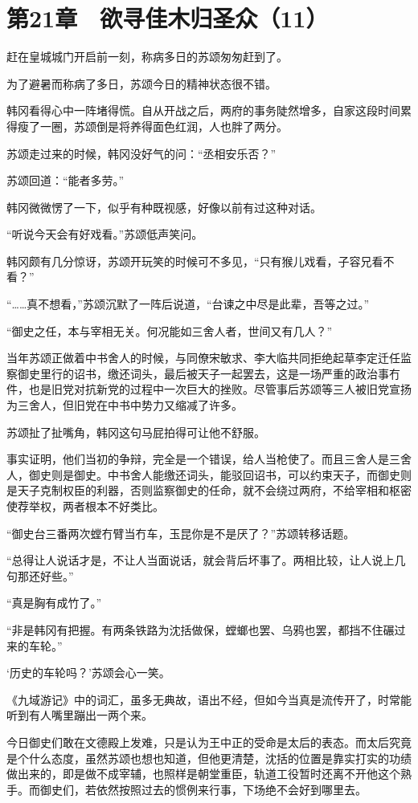 \section{第21章　欲寻佳木归圣众（11）}

赶在皇城城门开启前一刻，称病多日的苏颂匆匆赶到了。

为了避暑而称病了多日，苏颂今日的精神状态很不错。

韩冈看得心中一阵堵得慌。自从开战之后，两府的事务陡然增多，自家这段时间累得瘦了一圈，苏颂倒是将养得面色红润，人也胖了两分。

苏颂走过来的时候，韩冈没好气的问：“丞相安乐否？”

苏颂回道：“能者多劳。”

韩冈微微愣了一下，似乎有种既视感，好像以前有过这种对话。

“听说今天会有好戏看。”苏颂低声笑问。

韩冈颇有几分惊讶，苏颂开玩笑的时候可不多见，“只有猴儿戏看，子容兄看不看？”

“……真不想看，”苏颂沉默了一阵后说道，“台谏之中尽是此辈，吾等之过。”

“御史之任，本与宰相无关。何况能如三舍人者，世间又有几人？”

当年苏颂正做着中书舍人的时候，与同僚宋敏求、李大临共同拒绝起草李定迁任监察御史里行的诏书，缴还词头，最后被天子一起罢去，这是一场严重的政治事冇件，也是旧党对抗新党的过程中一次巨大的挫败。尽管事后苏颂等三人被旧党宣扬为三舍人，但旧党在中书中势力又缩减了许多。

苏颂扯了扯嘴角，韩冈这句马屁拍得可让他不舒服。

事实证明，他们当初的争辩，完全是一个错误，给人当枪使了。而且三舍人是三舍人，御史则是御史。中书舍人能缴还词头，能驳回诏书，可以约束天子，而御史则是天子克制权臣的利器，否则监察御史的任命，就不会绕过两府，不给宰相和枢密使荐举权，两者根本不好类比。

“御史台三番两次螳冇臂当冇车，玉昆你是不是厌了？”苏颂转移话题。

“总得让人说话才是，不让人当面说话，就会背后坏事了。两相比较，让人说上几句那还好些。”

“真是胸有成竹了。”

“非是韩冈有把握。有两条铁路为沈括做保，螳螂也罢、乌鸦也罢，都挡不住碾过来的车轮。”

‘历史的车轮吗？’苏颂会心一笑。

《九域游记》中的词汇，虽多无典故，语出不经，但如今当真是流传开了，时常能听到有人嘴里蹦出一两个来。

今日御史们敢在文德殿上发难，只是认为王中正的受命是太后的表态。而太后究竟是个什么态度，虽然苏颂也想也知道，但他更清楚，沈括的位置是靠实打实的功绩做出来的，即是做不成宰辅，也照样是朝堂重臣，轨道工役暂时还离不开他这个熟手。而御史们，若依然按照过去的惯例来行事，下场绝不会好到哪里去。

